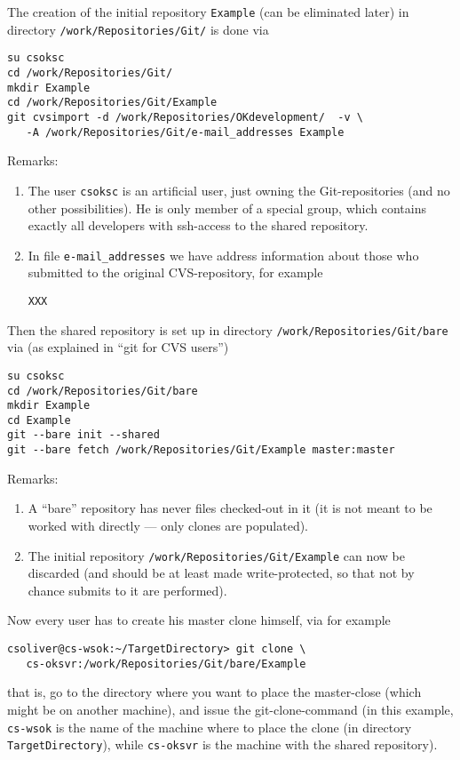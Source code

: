 \documentclass{book}
\newcommand{\filename}[1]{\texttt{#1}}
\newcommand{\name}[1]{\texttt{#1}}
\begin{document}
The creation of the initial repository \texttt{Example} (can be eliminated later) in directory \filename{/work/Repositories/Git/} is done via
\begin{verbatim}
su csoksc
cd /work/Repositories/Git/
mkdir Example
cd /work/Repositories/Git/Example
git cvsimport -d /work/Repositories/OKdevelopment/  -v \
   -A /work/Repositories/Git/e-mail_addresses Example
\end{verbatim}
Remarks:
\begin{enumerate}
\item The user \name{csoksc} is an artificial user, just owning the Git-repositories (and no other possibilities). He is only member of a special group, which contains exactly all developers with ssh-access to the shared repository.
\item In file \filename{e-mail\_addresses} we have address information about those who submitted to the original CVS-repository, for example
\begin{verbatim}
XXX
\end{verbatim}
\end{enumerate}
Then the shared repository is set up in directory \filename{/work/Repositories/Git/bare} via (as explained in ``git for CVS users'')
\begin{verbatim}
su csoksc
cd /work/Repositories/Git/bare
mkdir Example
cd Example
git --bare init --shared
git --bare fetch /work/Repositories/Git/Example master:master
\end{verbatim}
Remarks:
\begin{enumerate}
\item A ``bare'' repository has never files checked-out in it (it is not meant to be worked with directly --- only clones are populated).
\item The initial repository \filename{/work/Repositories/Git/Example} can now be discarded (and should be at least made write-protected, so that not by chance submits to it are performed).
\end{enumerate}
Now every user has to create his master clone himself, via for example
\begin{verbatim}
csoliver@cs-wsok:~/TargetDirectory> git clone \
   cs-oksvr:/work/Repositories/Git/bare/Example
\end{verbatim}
that is, go to the directory where you want to place the master-close (which might be on another machine), and issue the git-clone-command (in this example, \name{cs-wsok} is the name of the machine where to place the clone (in directory \filename{TargetDirectory}), while \name{cs-oksvr} is the machine with the shared repository).
\end{document}
